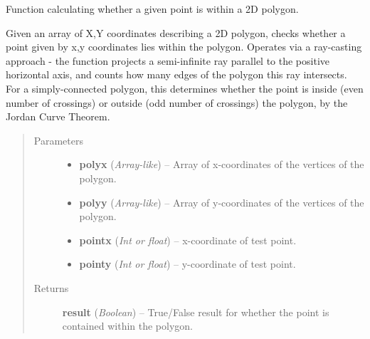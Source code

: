 \documentclass[letterpaper,10pt,english]{sphinxmanual}
\begin{document}
\begin{fulllineitems}
\label{eqtools:eqtools.core.inPolygon}
Function calculating whether a given point is within a 2D polygon.

Given an array of X,Y coordinates describing a 2D polygon, checks whether a
point given by x,y coordinates lies within the polygon. Operates via a
ray-casting approach - the function projects a semi-infinite ray parallel to
the positive horizontal axis, and counts how many edges of the polygon this
ray intersects. For a simply-connected polygon, this determines whether the
point is inside (even number of crossings) or outside (odd number of
crossings) the polygon, by the Jordan Curve Theorem.
\begin{quote}\begin{description}
\item[{Parameters}] \leavevmode\begin{itemize}
\item {} 
\textbf{polyx} (\emph{Array-like}) --
Array of x-coordinates of the vertices of the polygon.

\item {} 
\textbf{polyy} (\emph{Array-like}) --
Array of y-coordinates of the vertices of the polygon.

\item {} 
\textbf{pointx} (\emph{Int or float}) --
x-coordinate of test point.

\item {} 
\textbf{pointy} (\emph{Int or float}) --
y-coordinate of test point.

\end{itemize}

\item[{Returns}] \leavevmode
\textbf{result} (\emph{Boolean}) --
True/False result for whether the point is contained within the polygon.

\end{description}\end{quote}

\end{fulllineitems}

\end{document}
